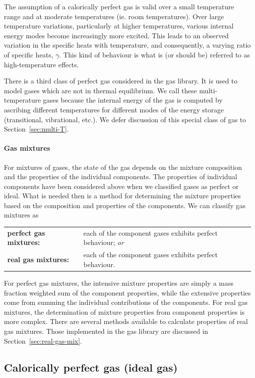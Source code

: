 The assumption of a calorically perfect gas is valid over a small temperature range and at moderate
temperatures (ie. room temperatures).
Over large temperature variations, particularly at higher temperatures, various internal energy modes
become increasingly more excited.
This leads to an observed variation in the specific heats with temperature, and consequently, 
a varying ratio of specific heats, $\gamma$.
This kind of behaviour is what is (or should be) referred to as high-temperature effects.

There is a third class of perfect gas considered in the gas library.
It is used to model gases which are not in thermal equilibrium.
We call these multi-temperature gases because the internal energy of the gas
is computed by ascribing different temperatures for different modes of the energy storage
(transitional, vibrational, etc.).
We defer discussion of this special class of gas to Section~\ref{sec:multi-T}.

\paragraph{Gas mixtures}
For mixtures of gases, the state of the gas depends on the mixture
composition and the properties of the individual components.
The properties of individual components have been considered
above when we classified gases as perfect or ideal.
What is needed then is a method for determining the mixture
properties based on the composition and properties of the components.
We can classify gas mixtures as\\
\begin{tabular}{lp{12cm}}
\textbf{perfect gas mixtures:} & each of the component gases exhibits perfect behaviour; \emph{or} \\
\textbf{real gas mixtures:} & each of the component gases exhibits perfect behaviour.
\end{tabular}

For perfect gas mixtures, the intensive mixture properties are simply a mass fraction weighted sum
of the component properties, while the extensive properties come from summing the individual contributions
of the components.
For real gas mixtures, the determination of mixture properties from component properties is more complex.
There are several methods available to calculate properties of real gas mixtures.
Those implemented in the gas library are discussed in Section~\ref{sec:real-gas-mix}.


\subsection{Calorically perfect gas (ideal gas)}
\label{sec:cal-perf}


